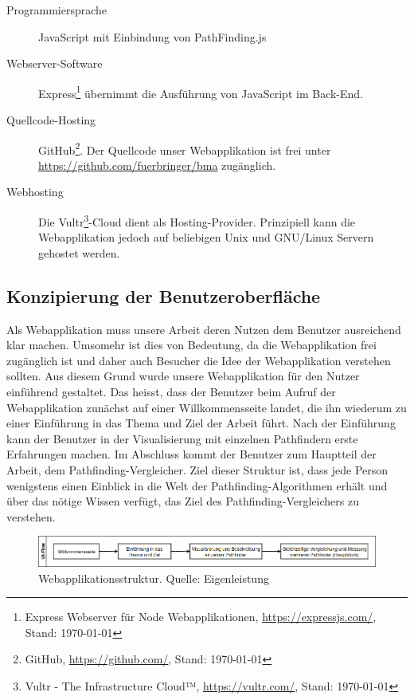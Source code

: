 \documentclass[12pt,a4paper,german]{report}
\begin{document}
\begin{description}
  \item [Programmiersprache] JavaScript mit Einbindung von PathFinding.js \cite{pfjs}
  \item [Webserver-Software] Express\footnote{Express Webserver für Node Webapplikationen, \url{https://expressjs.com/}, Stand: \today} übernimmt die Ausführung von JavaScript im Back-End.
  \item [Quellcode-Hosting] GitHub\footnote{GitHub, \url{https://github.com/}, Stand: \today}. Der Quellcode unser Webapplikation ist frei unter\\ \url{https://github.com/fuerbringer/bma} zugänglich.
  \item [Webhosting] Die Vultr\footnote{Vultr - The Infrastructure Cloud™, \url{https://vultr.com/}, Stand: \today}-Cloud dient als Hosting-Provider. Prinzipiell kann die Webapplikation jedoch auf beliebigen Unix und GNU/Linux Servern gehostet werden.
\end{description}

\subsection{Konzipierung der Benutzeroberfläche}
Als Webapplikation muss unsere Arbeit deren Nutzen dem Benutzer ausreichend klar machen. 
Umsomehr ist dies von Bedeutung, da die Webapplikation frei zugänglich ist und daher auch Besucher die Idee der Webapplikation verstehen sollten. 
Aus diesem Grund wurde unsere Webapplikation für den Nutzer einführend gestaltet. 
Das heisst, dass der Benutzer beim Aufruf der Webapplikation zunächst auf einer Willkommensseite landet, die ihn wiederum zu einer Einführung in das Thema und Ziel der Arbeit führt. 
Nach der Einführung kann der Benutzer in der Visualisierung mit einzelnen Pathfindern erste Erfahrungen machen. 
Im Abschluss kommt der Benutzer zum Hauptteil der Arbeit, dem Pathfinding-Vergleicher. 
Ziel dieser Struktur ist, dass jede Person wenigstens einen Einblick in die Welt der Pathfinding-Algorithmen erhält und über das nötige Wissen verfügt, das Ziel des Pathfinding-Vergleichers zu verstehen.
\begin{figure}[H]
  \centering
  \includegraphics[width=16cm]{uiflow}
  \caption[Struktur der Webapplikation.]{Webapplikationsstruktur. Quelle: Eigenleistung}
  \label{fig:uiflow}
\end{figure}
\end{document}
